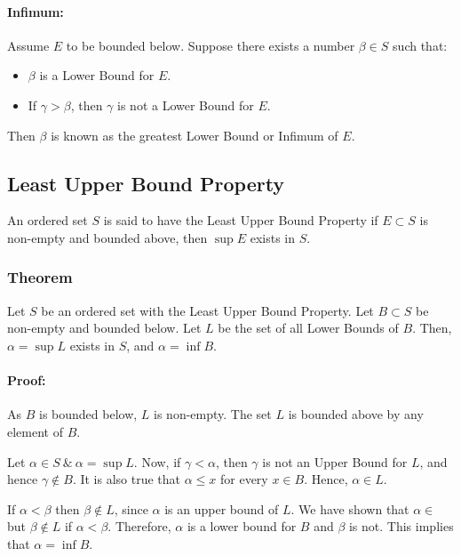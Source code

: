 \documentclass[12pt, oneside]{book}
\begin{document}
\paragraph{Infimum:} Assume \(E\) to be bounded below.
Suppose there exists a number \(\beta \in S\) such that:
\begin{itemize}
    \item \(\beta\) is a Lower Bound for \(E\).
    \item If \(\gamma > \beta\), then \(\gamma\) is not a Lower Bound for \(E\).
\end{itemize}
Then \( \beta \) is known as the greatest Lower Bound or Infimum of \(E\).

\subsection{Least Upper Bound Property}
An ordered set \(S\) is said to have the Least Upper Bound Property if \(E \subset S\) is non-empty and bounded above, then \( \sup E\) exists in \(S\).

\subsubsection{Theorem}
Let \(S\) be an ordered set with the Least Upper Bound Property.
Let \(B \subset S\) be non-empty and bounded below.
Let \(L\) be the set of all Lower Bounds of \(B\).
Then, \( \alpha = \sup L \) exists in \(S\), and \(\alpha = \inf B\).

\paragraph{Proof:} As \(B\) is bounded below, \(L\) is non-empty.
The set \(L\) is bounded above by any element of \(B\).

Let \( \alpha \in S \: \& \: \alpha = \sup L \).
Now, if \( \gamma < \alpha \), then \(\gamma\) is not an Upper Bound for \(L\), and hence \( \gamma \notin B \).
It is also true that \( \alpha \leq x \) for every \( x \in B \).
Hence, \( \alpha \in L \).

If \( \alpha < \beta \) then \( \beta \notin L \), since \( \alpha \) is an upper bound of \(L\).
We have shown that \( \alpha \in \) but \(\beta \notin L\) if \( \alpha < \beta \).
Therefore, \( \alpha \) is a lower bound for \(B\) and \(\beta\) is not.
This implies that \( \alpha = \inf B \).
\end{document}
